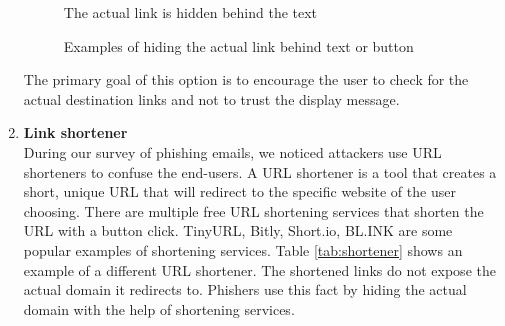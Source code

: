 \begin{enumerate}
\begin{figure}[!ht]
{                  \caption{The actual link is hidden behind the text}
                  \label{fig:hide-text}
              }
              \caption{Examples of hiding the actual link behind text or button}
          \end{figure}

          The primary goal of this option is to encourage the user to check for the actual destination links and not to trust the display message.

    \item \textbf{Link shortener}\\
          During our survey of phishing emails, we noticed attackers use URL shorteners to confuse the end-users. A URL shortener is a tool that creates a short, unique URL that will redirect to the specific website of the user choosing. There are multiple free URL shortening services that shorten the URL with a button click. TinyURL, Bitly, Short.io, BL.INK are some popular examples of shortening services. Table \ref{tab:shortener} shows an example of a different URL shortener. The shortened links do not expose the actual domain it redirects to. Phishers use this fact by hiding the actual domain with the help of shortening services.

          \begin{table}[!ht]


\end{table}
\end{enumerate}
